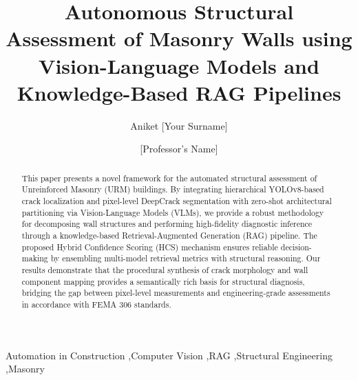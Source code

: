 \documentclass[final,5p,times]{elsarticle}
\begin{document}
\begin{frontmatter}

\title{Autonomous Structural Assessment of Masonry Walls using Vision-Language Models and Knowledge-Based RAG Pipelines}

\author[1]{Aniket [Your Surname]}
\author[1]{[Professor's Name]}

\address[1]{Department of Civil Engineering, [Your University], [City], [Country]}


\begin{abstract}
This paper presents a novel framework for the automated structural assessment of Unreinforced Masonry (URM) buildings. By integrating hierarchical YOLOv8-based crack localization and pixel-level DeepCrack segmentation with zero-shot architectural partitioning via Vision-Language Models (VLMs), we provide a robust methodology for decomposing wall structures and performing high-fidelity diagnostic inference through a knowledge-based Retrieval-Augmented Generation (RAG) pipeline. The proposed Hybrid Confidence Scoring (HCS) mechanism ensures reliable decision-making by ensembling multi-model retrieval metrics with structural reasoning. Our results demonstrate that the procedural synthesis of crack morphology and wall component mapping provides a semantically rich basis for structural diagnosis, bridging the gap between pixel-level measurements and engineering-grade assessments in accordance with FEMA 306 standards.
\end{abstract}

\begin{keyword}
Automation in Construction \sep Computer Vision \sep RAG \sep Structural Engineering \sep Masonry
\end{keyword}

\end{frontmatter}
















\end{document}
